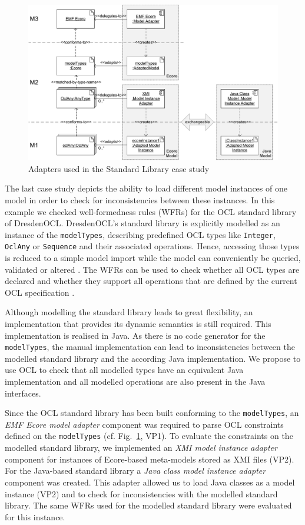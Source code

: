 \begin{figure}[!t]
	\centering
		\includegraphics[width=1.00\textwidth]{figures/casestudy03.pdf}
	\caption{Adapters used in the Standard Library case study}
	\label{fig:casestudy03}
\end{figure}

The last case study depicts the ability to load different model instances of one model 
in order to check for inconsistencies between these instances. In this example we 
checked well-formedness rules (WFRs) for the OCL standard library of DresdenOCL. 
DresdenOCL's standard library is explicitly modelled as 
an instance of the \texttt{model\-Types}, describing predefined OCL types like \texttt{Integer}, 
\texttt{OclAny} or \texttt{Sequence} and their associated operations. 
Hence, accessing those types is reduced to a simple model 
import while the model can conveniently be queried, validated or altered 
\cite{braeuerOCL07}. The WFRs can be used to check whether all OCL types are 
declared and whether they support all operations that are defined by the 
current OCL specification \cite{spec:OCL2-2}.

Although modelling the standard library leads to great flexibility, 
an implementation that provides its dynamic semantics is still required. 
This implementation is realised in Java. As there is no code generator for the \texttt{model\-Types}, 
the manual implementation can lead to inconsistencies between 
the modelled standard library and the according Java implementation.
We propose to use OCL to check that all modelled types have an equivalent Java 
implementation and all modelled operations are also present in the Java interfaces.

Since the OCL standard library has been built conforming to the \texttt{model\-Types}, an
\textit{EMF Ecore model adapter} component was required to parse OCL constraints
defined on the \texttt{model\-Types} (cf. Fig.~\ref{fig:casestudy03}, VP1).
To evaluate the constraints on the modelled standard library,
we implemented an \textit{XMI model instance adapter} component for instances of 
Ecore-based meta-models stored as XMI files (VP2). For the Java-based standard library
a \emph{Java class model instance adapter} component was created. This adapter
allowed us to load Java classes as a model instance (VP2)
and to check for inconsistencies with the modelled standard library. The same WFRs 
used for the modelled standard library were evaluated for this instance. 


